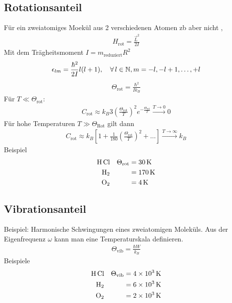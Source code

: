 \subsection*{Rotationsanteil}
F\"ur ein zweiatomiges Moek\"ul aus 2 verschiedenen Atomen zb
 aber nicht , 
%
\begin{align*}
    H_\text{rot} = \frac{\vec{L}^2}{2 I}
\end{align*}
%
Mit dem Tr\"agheitsmoment $I = m_\text{reduziert} R^2$
%
\begin{align*}
    \epsilon_{lm} = \frac{\hbar^2}{2 I} l(l+1), \quad\forall\, l \in \mathbb{N},
    m = -l, -l+1 ,\dotsc, +l
\end{align*}
%
%
\begin{align*}
    \Theta_\text{rot} = \frac{\hbar^2}{I k_B}
\end{align*}
%
%
F\"ur $T \ll \Theta_\text{rot}$:
\begin{align*}
    C_\text{rot} \approx k_B 3 \left( \frac{\Theta_\text{rot}}{T} \right)^2
    e^{- \frac{\Theta_\text{rot}}{T}} \xrightarrow{ T \to 0} 0 
\end{align*}
%
F\"ur hohe Temperaturen $T \gg \Theta_\text{Rot}$ gilt dann
%
\begin{align*}
    C_\text{rot} \approx k_B \left[ 1 + \frac{1}{180} \left( \frac{\Theta_\text{rot}}{T} \right)^2 + \ldots \right] \xrightarrow{T \to \infty} k_B
\end{align*}
%
Beispiel
%
\begin{align*}
    \ce{H Cl} && \Theta_\text{rot} & = \SI{30}{\kelvin} \\
    \ce{H2} && &= \SI{170}{\kelvin} \\
    \ce{O2} && &= \SI{4}{\kelvin} \\
\end{align*}
%
\subsection*{Vibrationsanteil}
Beispiel: Harmonische Schwingungen eines zweiatomigen Molek\"uls.
Aus der Eigenfrequenz $\omega$ kann man eine Temperaturskala definieren.
%
\begin{align*}
    \Theta_\text{vib} = \frac{\hbar W }{k_B}
\end{align*}
%
Beispiele
%
\begin{align*}
    \ce{H Cl} && \Theta_\text{vib} & = \SI{4e3}{\kelvin} \\
    \ce{H2} && &= \SI{6e3}{\kelvin} \\
    \ce{O2} && &= \SI{2e3}{\kelvin} \\
\end{align*}

